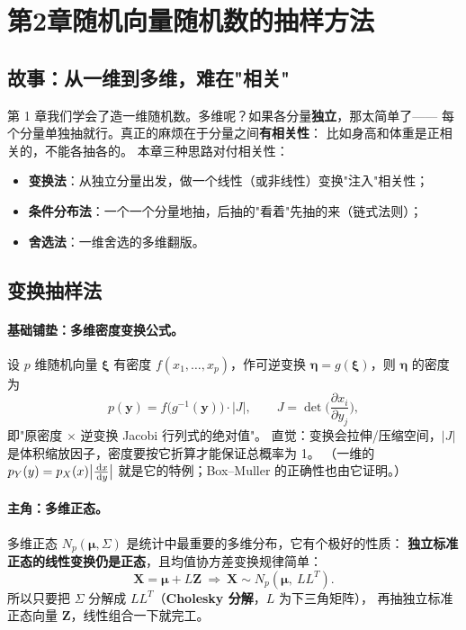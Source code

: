 \section{第2章\quad 随机向量随机数的抽样方法}

\subsection{故事：从一维到多维，难在"相关"}

第 1 章我们学会了造一维随机数。多维呢？如果各分量\textbf{独立}，那太简单了——
每个分量单独抽就行。真正的麻烦在于分量之间\textbf{有相关性}：
比如身高和体重是正相关的，不能各抽各的。
本章三种思路对付相关性：
\begin{itemize}[leftmargin=2em]
  \item \textbf{变换法}：从独立分量出发，做一个线性（或非线性）变换"注入"相关性；
  \item \textbf{条件分布法}：一个一个分量地抽，后抽的"看着"先抽的来（链式法则）；
  \item \textbf{舍选法}：一维舍选的多维翻版。
\end{itemize}

\subsection{变换抽样法}

\paragraph{基础铺垫：多维密度变换公式。}
设 $p$ 维随机向量 $\bm\xi$ 有密度 $f(x_1,\dots,x_p)$，作可逆变换 $\bm\eta=g(\bm\xi)$，则 $\bm\eta$ 的密度为
\[
p(\bm y)=f\big(g^{-1}(\bm y)\big)\cdot|J| ,\qquad
J=\det\Big(\frac{\partial x_i}{\partial y_j}\Big),
\]
即"原密度 $\times$ 逆变换 Jacobi 行列式的绝对值"。
直觉：变换会拉伸/压缩空间，$|J|$ 是体积缩放因子，密度要按它折算才能保证总概率为 1。
（一维的 $p_Y(y)=p_X(x)\big|\frac{\,\mathrm{d} x}{\,\mathrm{d} y}\big|$ 就是它的特例；Box--Muller 的正确性也由它证明。）

\paragraph{主角：多维正态。}
多维正态 $N_p(\bm\mu,\Sigma)$ 是统计中最重要的多维分布，它有个极好的性质：
\textbf{独立标准正态的线性变换仍是正态}，且均值协方差变换规律简单：
\[
\bm X=\bm\mu+L\bm Z\ \Longrightarrow\ \bm X\sim N_p(\bm\mu,\ LL^{T}).
\]
所以只要把 $\Sigma$ 分解成 $LL^T$（\textbf{Cholesky 分解}，$L$ 为下三角矩阵），
再抽独立标准正态向量 $\bm Z$，线性组合一下就完工。

